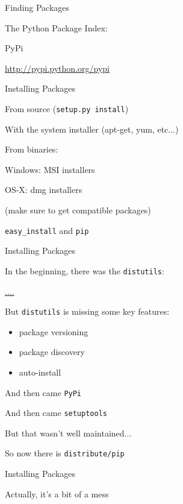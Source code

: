 \documentclass{beamer}
\begin{document}
\begin{frame}[fragile]{Finding Packages}

{\Large The Python Package Index:}

\vfill
{\LARGE PyPi}

\vfill
\url{http://pypi.python.org/pypi}

\end{frame} 

\begin{frame}[fragile]{Installing Packages}

{\Large From source}
(\verb|setup.py install|)

\vfill
{\Large With the system installer (apt-get, yum, etc...)}

\vfill
{\Large From binaries: }

\vfill
{\Large Windows:} MSI installers

\vfill
{\Large OS-X:} dmg installers 

(make sure to get compatible packages)

\vfill
{\Large \verb|easy_install| and \verb|pip|}

\end{frame} 

\begin{frame}[fragile]{Installing Packages}

{\Large In the beginning, there was the \verb|distutils|:}

\url{....}

{\Large But \verb|distutils| is missing some key features:}
\begin{itemize}
  \item package versioning
  \item package discovery
  \item auto-install
\end{itemize}

\vfill
{\Large And then came \verb|PyPi|}

\vfill
{\Large And then came \verb|setuptools|}

\vfill
{\Large But that wasn't well maintained...}

\vfill
{\Large So now there is \verb|distribute/pip|}

\end{frame} 

\begin{frame}[fragile]{Installing Packages}

\vfill
{\LARGE Actually, it's a bit of a mess}
\vfill

\end{frame} 
\end{document}
